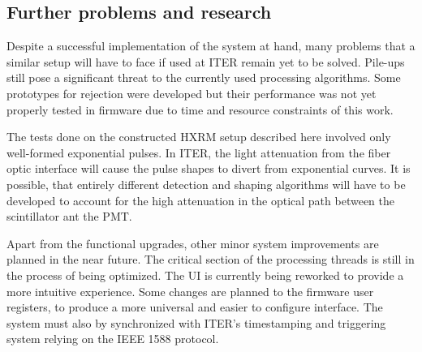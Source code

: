 \subsection{Further problems and research}

Despite a successful implementation of the system at hand, 
many problems that a similar setup will have to face
if used at ITER remain yet to be solved.
Pile-ups still pose a significant threat to the currently used processing algorithms. 
Some prototypes for rejection
were developed but their performance was not yet properly tested in firmware
due to time and resource constraints of this work.


The tests done on the constructed HXRM setup described here
involved only well-formed exponential pulses.
In ITER, the light attenuation from the fiber optic interface
will cause the pulse shapes to divert from exponential curves.
It is possible, that entirely different detection and shaping
algorithms will have to be developed to account for the high 
attenuation in the optical path between the scintillator ant the PMT. 


Apart from the functional upgrades, other minor system improvements are planned
in the near future. The critical section of the processing threads
is still in the process of being optimized. The UI is currently 
being reworked to provide a more intuitive experience. 
Some changes are planned to the firmware user registers, to produce
a more universal and easier to configure interface.
The system must also by synchronized with ITER's timestamping 
and triggering system relying on the IEEE 1588 protocol.


